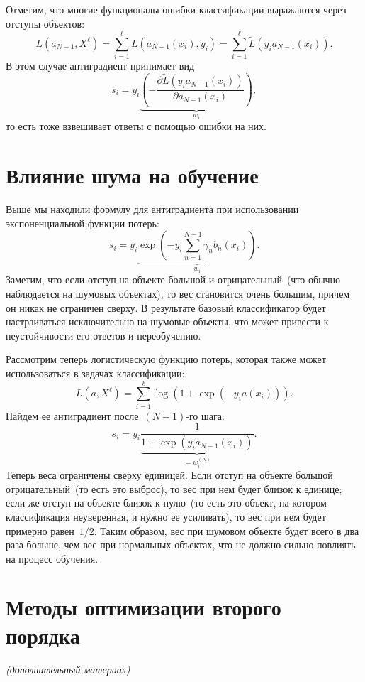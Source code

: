\documentclass[12pt,fleqn]{article}
\begin{document}
Отметим, что многие функционалы ошибки классификации
выражаются через отступы объектов:
\[
    L(a_{N - 1}, X^\ell)
    =
    \sum_{i = 1}^{\ell}
        L(a_{N - 1}(x_i), y_i)
    =
    \sum_{i = 1}^{\ell}
        \tilde
        L(y_i a_{N - 1}(x_i)).
\]
В этом случае антиградиент принимает вид
\[
    s_i
    =
    y_i
    \underbrace{\left(
        -\frac{
            \partial \tilde L(y_i a_{N - 1}(x_i))
        }{
            \partial a_{N - 1}(x_i)
        }
    \right)}_{w_i},
\]
то есть тоже взвешивает ответы с помощью ошибки на них.

\section{Влияние шума на обучение}
Выше мы находили формулу для антиградиента при использовании
экспоненциальной функции потерь:
\[
    s_i
    =
    y_i
    \underbrace{
        \exp\left(
            -y_i
            \sum_{n = 1}^{N - 1}
                \gamma_n b_n(x_i)
        \right)
    }_{w_i}.
\]
Заметим, что если отступ на объекте большой и отрицательный~(что обычно
наблюдается на шумовых объектах),
то вес становится очень большим,
причем он никак не ограничен сверху.
В результате базовый классификатор будет настраиваться
исключительно на шумовые объекты,
что может привести к неустойчивости его ответов и переобучению.

Рассмотрим теперь логистическую функцию потерь, которая
также может использоваться в задачах классификации:
\[
    L(a, X^\ell)
    =
    \sum_{i = 1}^{\ell}
        \log \left(
            1
            +
            \exp\left(
                -y_i a(x_i)
            \right)
        \right).
\]
Найдем ее антиградиент после~$(N - 1)$-го шага:
\[
    s_i
    =
    y_i
    \underbrace{
        \frac{
            1
        }{
            1
            +
            \exp(
                y_i a_{N - 1}(x_i)
            )
        }
    }_{=w_i^{(N)}}.
\]
Теперь веса ограничены сверху единицей.
Если отступ на объекте большой отрицательный~(то есть это выброс),
то вес при нем будет близок к единице;
если же отступ на объекте близок к нулю~(то есть
это объект, на котором классификация неуверенная,
и нужно ее усиливать), то вес при нем будет примерно равен~$1/2$.
Таким образом, вес при шумовом объекте будет всего в два раза больше,
чем вес при нормальных объектах, что не должно
сильно повлиять на процесс обучения.

\section{Методы оптимизации второго порядка}
\emph{(дополнительный материал)}
\end{document}
